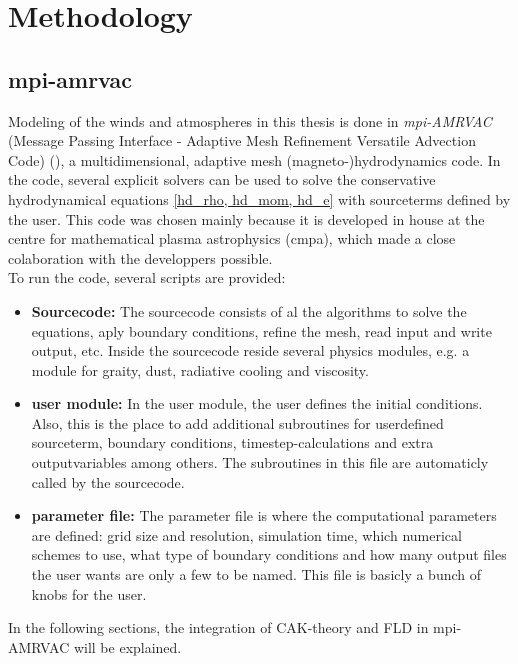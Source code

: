 \chapter{Methodology}

\section{mpi-amrvac} \label{section: methods amrvac}
Modeling of the winds and atmospheres in this thesis is done in \emph{mpi-AMRVAC} (Message Passing Interface - Adaptive Mesh Refinement Versatile Advection Code) (\cite{Porth2014}), a multidimensional, adaptive mesh (magneto-)hydrodynamics code. In the code, several explicit solvers can be used to solve the conservative hydrodynamical equations \eqref{hd_rho, hd_mom, hd_e} with sourceterms defined by the user. This code was chosen mainly because it is developed in house at the centre for mathematical plasma astrophysics (cmpa), which made a close colaboration with the developpers possible.\\
To run the code, several scripts are provided:

\begin{itemize}
\item \textbf{Sourcecode:} The sourcecode consists of al the algorithms to solve the equations, aply boundary conditions, refine the mesh, read input and write output, etc. Inside the sourcecode reside several physics modules, e.g. a module for graity, dust, radiative cooling and viscosity.\\

\item \textbf{user module:} In the user module, the user defines the initial conditions. Also, this is the place to add additional subroutines for userdefined sourceterm, boundary conditions, timestep-calculations and extra outputvariables among others. The subroutines in this file are automaticly called by the sourcecode.\\

\item \textbf{parameter file:} The parameter file is where the computational parameters are defined: grid size and resolution, simulation time, which numerical schemes to use, what type of boundary conditions and how many output files the user wants are only a few to be named. This file is basicly a bunch of knobs for the user.\\
\end{itemize}

In the following sections, the integration of CAK-theory and FLD in mpi-AMRVAC will be explained.


